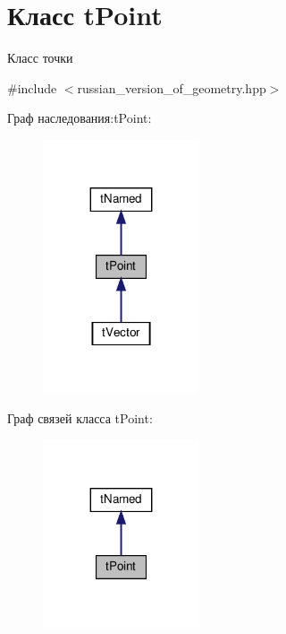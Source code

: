 \hypertarget{classtPoint}{}\section{Класс t\+Point}
\label{classtPoint}


Класс точки  




{\ttfamily \#include $<$russian\+\_\+version\+\_\+of\+\_\+geometry.\+hpp$>$}



Граф наследования\+:t\+Point\+:\nopagebreak
\begin{figure}[H]
\begin{center}
\leavevmode
\includegraphics[width=131pt]{classtPoint__inherit__graph}
\end{center}
\end{figure}


Граф связей класса t\+Point\+:\nopagebreak
\begin{figure}[H]
\begin{center}
\leavevmode
\includegraphics[width=131pt]{classtPoint__coll__graph}
\end{center}
\end{figure}
